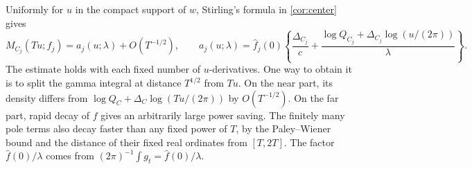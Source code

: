 \documentclass[11pt,reqno]{amsart}
\numberwithin{equation}{section}
\theoremstyle{definition}
\theoremstyle{remark}
\begin{document}
Uniformly for $u$ in the compact support of $w$, Stirling's formula in \eqref{cor:center} gives
\begin{equation}M_{C_j}(Tu;f_j)=a_j(u;\lambda)+O(T^{-1/2}),\qquad
a_j(u;\lambda)=\widehat f_j(0)\left\{\frac{\Delta_{C_j}}c+
\frac{\log Q_{C_j}+\Delta_{C_j}\log(u/(2\pi))}{\lambda}\right\}.\label{cor:arch-asymptotic}\end{equation}
The estimate holds with each fixed number of $u$-derivatives. One way to obtain it is to split the gamma integral at distance $T^{1/2}$ from $Tu$. On the near part, its density differs from $\log Q_C+\Delta_C\log(Tu/(2\pi))$ by $O(T^{-1/2})$. On the far part, rapid decay of $f$ gives an arbitrarily large power saving. The finitely many pole terms also decay faster than any fixed power of $T$, by the Paley--Wiener bound and the distance of their fixed real ordinates from $[T,2T]$. The factor $\widehat f(0)/\lambda$ comes from $(2\pi)^{-1}\int g_t=\widehat f(0)/\lambda$.
\end{document}
